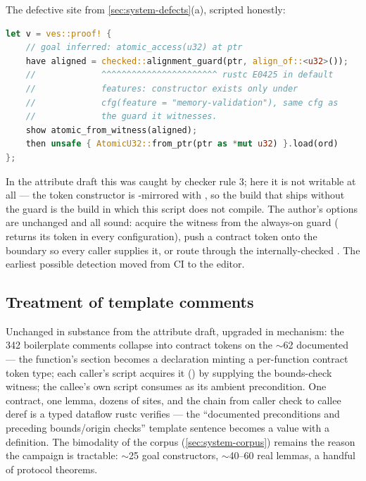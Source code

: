 The defective site from \cref{sec:system-defects}(a), scripted
honestly:

\begin{lstlisting}[language=Rust,
  morekeywords={goal,have,show,then,trust,note}]
let v = ves::proof! {
    // goal inferred: atomic_access(u32) at ptr
    have aligned = checked::alignment_guard(ptr, align_of::<u32>());
    //             ^^^^^^^^^^^^^^^^^^^^^^^ rustc E0425 in default
    //             features: constructor exists only under
    //             cfg(feature = "memory-validation"), same cfg as
    //             the guard it witnesses.
    show atomic_from_witness(aligned);
    then unsafe { AtomicU32::from_ptr(ptr as *mut u32) }.load(ord)
};
\end{lstlisting}

In the attribute draft this was caught by checker rule 3; here it is
not writable at all --- the token constructor is -mirrored
with , so the build that ships without the
guard is the build in which this script does not compile. The
author's options are unchanged and all sound: acquire the witness
from the always-on guard ( returns
its token in every configuration), push a contract token onto the
 boundary so every caller supplies it, or route
through the internally-checked . The
earliest possible detection moved from CI to the editor.

\subsection{Treatment of template comments}

Unchanged in substance from the attribute draft, upgraded in
mechanism: the 342 boilerplate comments collapse into contract tokens
on the $\sim$62 documented  --- the function's
 section becomes a  declaration
minting a per-function contract token type; each caller's script
acquires it ()
by supplying the bounds-check witness; the callee's own script
consumes  as its ambient precondition. One contract, one
lemma, dozens of sites, and the chain from caller check to callee
deref is a typed dataflow rustc verifies --- the ``documented
preconditions and preceding bounds/origin checks'' template sentence
becomes a value with a definition. The bimodality of the corpus
(\cref{sec:system-corpus}) remains the reason the campaign is
tractable: $\sim$25 goal constructors, $\sim$40--60 real lemmas, a
handful of protocol theorems.
